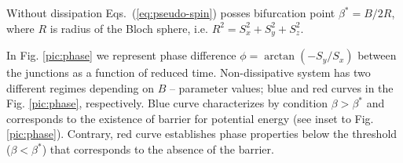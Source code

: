 \documentclass[aps, pre, preprint, groupedaddress, superscriptaddress, showkeys, showpacs] {revtex4-1}
\begin{document}
{Without dissipation Eqs.\ ({\ref{eq:pseudo-spin}}) posses  bifurcation point $\beta^* = B / 2R$, where $R$ is  radius of the Bloch  sphere, i.e. $R^2=S_x^2 + S_y^2 + S_z^2$.
%
%

In Fig. \ref{pic:phase} we represent phase difference $ \phi = \arctan(-S_y / S_x)$ between the junctions as a function of reduced time.  Non-dissipative system has two different regimes depending on  $B$ -- parameter values; blue and red curves in the Fig. \ref{pic:phase}, respectively. Blue  curve characterizes by condition $\beta > \beta^*$ and  corresponds to the existence of barrier for potential energy (see inset to Fig. \ref{pic:phase}). Contrary,  red curve establishes phase properties below the threshold ($\beta < \beta^*$) that corresponds to the absence of the barrier. 

}
\end{document}
